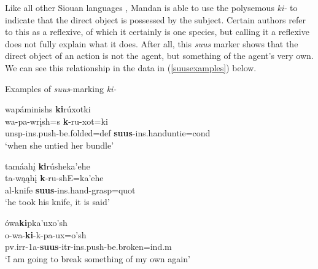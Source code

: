 
Like all other Siouan languages \citep[22]{mixco1997a}, Mandan is able to use the polysemous \textit{ki-} to indicate that the direct object is possessed by the subject. Certain authors refer to this as a reflexive, of which it certainly is one species, but calling it a reflexive does not fully explain what it does. After all, this \textit{suus} marker shows that the direct object of an action is not the agent, but something of the agent's very own. We can see this relationship in the data in (\ref{suusexamples}) below.

\newpage

\begin{exe}
\item\label{suusexamples} Examples of \textit{suus}-marking \textit{ki-}

	\begin{xlist}
	
	
	
	\item \glll wapáminishs \textbf{ki}rúxotki\\
	wa-pa-wrįsh=s \textbf{k}-ru-xot=ki\\
	unsp-ins.push-\textnormal{be.folded}=def \textbf{suus}-ins.hand\textnormal{untie}=cond\\
	\glt `when she untied her bundle' \citep[11]{kennard1936}
	
	\item \glll tamáahį \textbf{ki}rúsheka'ehe\\
	ta-wąąhį \textbf{k}-ru-shE=ka'ehe\\
	al-\textnormal{knife} \textbf{suus}-ins.hand-\textnormal{grasp}=quot\\
	\glt `he took his knife, it is said' \citep[11]{kennard1936}
	
	\item \glll ówa\textbf{ki}pka'uxo'sh\\
	o-wa-\textbf{ki}-k-pa-ux=o'sh\\
	pv.irr-1a-\textbf{suus}-itr-ins.push-\textnormal{be.broken}=ind.m\\
	\glt `I am going to break something of my own again' \citep[450]{hollow1970}
	

\end{xlist}
\end{exe}
